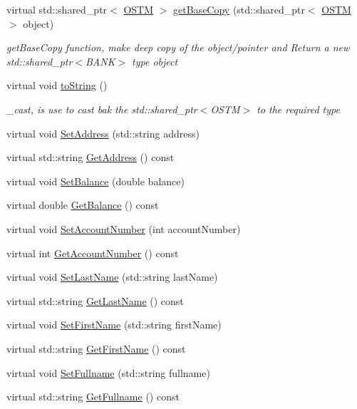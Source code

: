 \begin{DoxyCompactItemize}
virtual std\+::shared\+\_\+ptr$<$ \hyperlink{class_o_s_t_m}{O\+S\+TM} $>$ \hyperlink{class_u_l_s_t_e_r_ad0c05e562b0c67283edfa4940c9aa728}{get\+Base\+Copy} (std\+::shared\+\_\+ptr$<$ \hyperlink{class_o_s_t_m}{O\+S\+TM} $>$ object)
\begin{DoxyCompactList}\small\item\em get\+Base\+Copy function, make deep copy of the object/pointer and Return a new std\+::shared\+\_\+ptr$<$\+B\+A\+N\+K$>$ type object \end{DoxyCompactList}\item 
virtual void \hyperlink{class_u_l_s_t_e_r_a341bbcb3f7d6ef10f30d4734ceed10ee}{to\+String} ()
\begin{DoxyCompactList}\small\item\em \+\_\+cast, is use to cast bak the std\+::shared\+\_\+ptr$<$\+O\+S\+T\+M$>$ to the required type \end{DoxyCompactList}\item 
virtual void \hyperlink{class_u_l_s_t_e_r_a5b0662f0524ce8ce710881a05b431fad}{Set\+Address} (std\+::string address)
\item 
virtual std\+::string \hyperlink{class_u_l_s_t_e_r_ac31a16a960e53ea592b0d809a3ba167d}{Get\+Address} () const 
\item 
virtual void \hyperlink{class_u_l_s_t_e_r_a288ded3e96cf65a066f13529db94b182}{Set\+Balance} (double balance)
\item 
virtual double \hyperlink{class_u_l_s_t_e_r_ae70da9686ac038862900182a984e56eb}{Get\+Balance} () const 
\item 
virtual void \hyperlink{class_u_l_s_t_e_r_ae28bbc54174cd9b3b268d827c122c412}{Set\+Account\+Number} (int account\+Number)
\item 
virtual int \hyperlink{class_u_l_s_t_e_r_a1ad672ae865a9f559bf4d3c33c243d63}{Get\+Account\+Number} () const 
\item 
virtual void \hyperlink{class_u_l_s_t_e_r_ab2fec6b440c29b1953296ad23d4b432c}{Set\+Last\+Name} (std\+::string last\+Name)
\item 
virtual std\+::string \hyperlink{class_u_l_s_t_e_r_a9320b012bccda4ebf6b41c9ed972743c}{Get\+Last\+Name} () const 
\item 
virtual void \hyperlink{class_u_l_s_t_e_r_a07b57449397c42be1c2b512851dceebd}{Set\+First\+Name} (std\+::string first\+Name)
\item 
virtual std\+::string \hyperlink{class_u_l_s_t_e_r_a85ee4e42d9b309608d8dfbedac65ff27}{Get\+First\+Name} () const 
\item 
virtual void \hyperlink{class_u_l_s_t_e_r_a38d245bc2b6bb14bbb39c3347766140d}{Set\+Fullname} (std\+::string fullname)
\item 
virtual std\+::string \hyperlink{class_u_l_s_t_e_r_abb93ac2163f908782d00cbae169ebb91}{Get\+Fullname} () const 
\end{DoxyCompactItemize}


